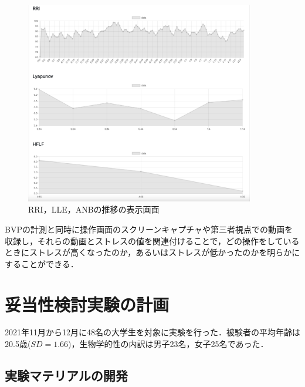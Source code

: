\begin{figure}[htbp]
  \begin{minipage}{\hsize}
    \begin{center}
       \includegraphics[width=100mm]{img/uxgraph1}
    \end{center}
    \caption{RRI，LLE，ANBの推移の表示画面}
    \label{fig:uxgraph1}
  \end{minipage}
\end{figure}

BVPの計測と同時に操作画面のスクリーンキャプチャや第三者視点での動画を収録し，それらの動画とストレスの値を関連付けることで，どの操作をしているときにストレスが高くなったのか，あるいはストレスが低かったのかを明らかにすることができる．

\section{妥当性検討実験の計画}

2021年11月から12月に48名の大学生を対象に実験を行った．被験者の平均年齢は20.5歳($SD=1.66$)，生物学的性の内訳は男子23名，女子25名であった．

\subsection{実験マテリアルの開発}

